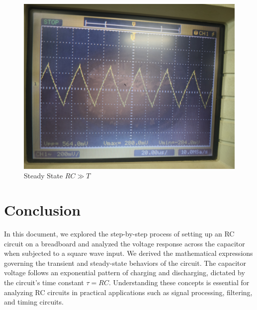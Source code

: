 \documentclass[12pt,a4paper]{report}
\begin{document}
\begin{itemize}
\begin{figure}[H]
\begin{minipage}[c]{0.48\textwidth}
    \end{minipage}
    \hfill
    \begin{minipage}[c]{0.48\textwidth}
        \includegraphics[width=\textwidth]{figs/sr3.jpg} %
        
    \end{minipage}
    \caption{Steady State $RC \gg T$}
    \label{fig:CRO-patterns}
\end{figure}
\end{itemize}



\section{Conclusion}
In this document, we explored the step-by-step process of setting up an RC circuit on a breadboard and analyzed the voltage response across the capacitor when subjected to a square wave input. We derived the mathematical expressions governing the transient and steady-state behaviors of the circuit. The capacitor voltage follows an exponential pattern of charging and discharging, dictated by the circuit's time constant \( \tau = RC \). Understanding these concepts is essential for analyzing RC circuits in practical applications such as signal processing, filtering, and timing circuits.
\end{document}
